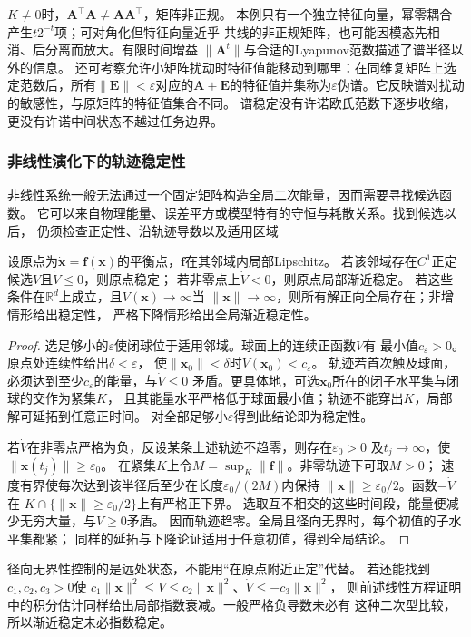 $K\neq0$时，$\bm A^\top\bm A\neq\bm A\bm A^\top$，矩阵非正规。
本例只有一个独立特征向量，幂零耦合产生$t2^{-t}$项；可对角化但特征向量近乎
共线的非正规矩阵，也可能因模态先相消、后分离而放大。有限时间增益
$\|\bm A^t\|$与合适的Lyapunov范数描述了谱半径以外的信息。
还可考察允许小矩阵扰动时特征值能移动到哪里：在同维复矩阵上选定范数后，所有$\|\bm E\|<\varepsilon$对应的$\bm A+\bm E$的特征值并集称为$\varepsilon$伪谱。它反映谱对扰动的敏感性，与原矩阵的特征值集合不同。
谱稳定没有许诺欧氏范数下逐步收缩，更没有许诺中间状态不越过任务边界。

\subsubsection{非线性演化下的轨迹稳定性}
\label{sec:action-state-nonlinear-stability}
非线性系统一般无法通过一个固定矩阵构造全局二次能量，因而需要寻找候选函数。
它可以来自物理能量、误差平方或模型特有的守恒与耗散关系。找到候选以后，
仍须检查正定性、沿轨迹导数以及适用区域
\begin{theorem}[连续时间Lyapunov判据]
  \label{thm:dynamical-nonlinear-lyapunov}
  设原点为$\dot{\bm x}=\bm f(\bm x)$的平衡点，$\bm f$在其邻域内局部Lipschitz。
  若该邻域存在$C^1$正定候选$V$且$\dot V\leq0$，则原点稳定；
  若非零点上$\dot V<0$，则原点局部渐近稳定。
  若这些条件在$\mathbb R^d$上成立，且$V(\bm x)\to\infty$当
  $\|\bm x\|\to\infty$，则所有解正向全局存在；非增情形给出稳定性，
  严格下降情形给出全局渐近稳定性。
\end{theorem}
\begin{proof}
  选足够小的$\varepsilon$使闭球位于适用邻域。球面上的连续正函数$V$有
  最小值$c_\varepsilon>0$。原点处连续性给出$\delta<\varepsilon$，
  使$\|\bm x_0\|<\delta$时$V(\bm x_0)<c_\varepsilon$。
  轨迹若首次触及球面，必须达到至少$c_\varepsilon$的能量，与$\dot V\leq0$
  矛盾。更具体地，可选$\bm x_0$所在的闭子水平集与闭球的交作为紧集$K$，
  且其能量水平严格低于球面最小值；轨迹不能穿出$K$，局部解可延拓到任意正时间。
  对全部足够小$\varepsilon$得到此结论即为稳定性。

  若$\dot V$在非零点严格为负，反设某条上述轨迹不趋零，则存在$\varepsilon_0>0$
  及$t_j\to\infty$，使$\|\bm x(t_j)\|\geq\varepsilon_0$。
  在紧集$K$上令$M=\sup_K\|\bm f\|$。非零轨迹下可取$M>0$；
  速度有界使每次达到该半径后至少在长度$\varepsilon_0/(2M)$内保持
  $\|\bm x\|\geq\varepsilon_0/2$。函数$-\dot V$在
  $K\cap\{\|\bm x\|\geq\varepsilon_0/2\}$上有严格正下界。
  选取互不相交的这些时间段，能量便减少无穷大量，与$V\geq0$矛盾。
  因而轨迹趋零。全局且径向无界时，每个初值的子水平集都紧；
  同样的延拓与下降论证适用于任意初值，得到全局结论。
\end{proof}
径向无界性控制的是远处状态，不能用“在原点附近正定”代替。
若还能找到$c_1,c_2,c_3>0$使
$c_1\|\bm x\|^2\leq V\leq c_2\|\bm x\|^2$、$\dot V\leq-c_3\|\bm x\|^2$，
则前述线性方程证明中的积分估计同样给出局部指数衰减。一般严格负导数未必有
这种二次型比较，所以渐近稳定未必指数稳定。

